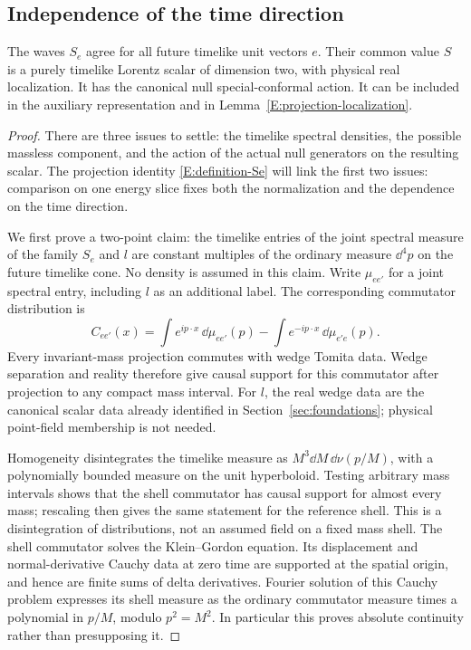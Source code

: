 \subsection{Independence of the time direction}

\begin{proposition}\label{E:accessible-scalar}
The waves $S_e$ agree for all future timelike unit vectors $e$.
Their common value $S$ is a purely timelike Lorentz scalar of dimension
two, with physical real localization.  It has the canonical null
special-conformal action.  It can be included in the auxiliary
representation and in Lemma~\ref{E:projection-localization}.
\end{proposition}

\begin{proof}
There are three issues to settle: the timelike spectral densities,
the possible massless component, and the action of the actual null
generators on the resulting scalar.  The projection identity
\eqref{E:definition-Se} will link the first two issues: comparison on
one energy slice fixes both the normalization and the dependence on
the time direction.

We first prove a two-point claim: the timelike entries of the joint
spectral measure of the family $S_e$ and $l$ are constant multiples of
the ordinary measure $\dd^4p$ on the future timelike cone.  No density
is assumed in this claim.  Write $\mu_{ee'}$ for a joint spectral
entry, including $l$ as an additional label.  The corresponding
commutator distribution is
\[
 C_{ee'}(x)=\int e^{ip\cdot x}\,\dd\mu_{ee'}(p)
              -\int e^{-ip\cdot x}\,\dd\mu_{e'e}(p).
\]
Every invariant-mass projection commutes with wedge Tomita data.
Wedge separation and reality therefore give causal support for this
commutator after projection to any compact mass interval.  For $l$,
the real wedge data are the canonical scalar data already identified
in Section~\ref{sec:foundations}; physical point-field membership is
not needed.

Homogeneity disintegrates the timelike measure as
$M^3\dd M\,\dd\nu(p/M)$, with a polynomially bounded measure on the
unit hyperboloid.  Testing arbitrary mass intervals shows that the
shell commutator has causal support for almost every mass; rescaling
then gives the same statement for the reference shell.  This is a
disintegration of distributions, not an assumed field on a fixed
mass shell.  The shell commutator solves the Klein--Gordon equation.
Its displacement and normal-derivative Cauchy data at zero time are
supported at the spatial origin, and hence are finite sums of delta
derivatives.  Fourier solution of this Cauchy problem expresses its
shell measure as the ordinary commutator measure times a polynomial
in $p/M$, modulo $p^2=M^2$.  In particular this proves absolute
continuity rather than presupposing it.


\end{proof}
